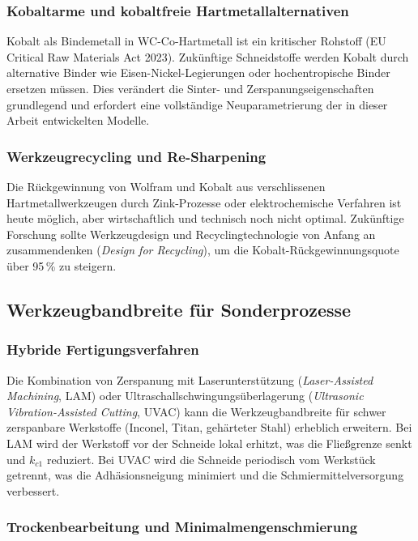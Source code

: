 ﻿\documentclass[a4paper,12pt]{article}
\theoremstyle{definition}
\begin{document}
\subsubsection{Kobaltarme und kobaltfreie Hartmetallalternativen}

Kobalt als Bindemetall in WC-Co-Hartmetall ist ein kritischer Rohstoff (EU
Critical Raw Materials Act 2023). Zukünftige Schneidstoffe werden Kobalt
durch alternative Binder wie Eisen-Nickel-Legierungen oder hochentropische
Binder ersetzen müssen. Dies verändert die Sinter- und Zerspanungseigenschaften
grundlegend und erfordert eine vollständige Neuparametrierung der in dieser
Arbeit entwickelten Modelle.

\subsubsection{Werkzeugrecycling und Re-Sharpening}

Die Rückgewinnung von Wolfram und Kobalt aus verschlissenen Hartmetallwerkzeugen
durch Zink-Prozesse oder elektrochemische Verfahren ist heute möglich, aber
wirtschaftlich und technisch noch nicht optimal. Zukünftige Forschung sollte
Werkzeugdesign und Recyclingtechnologie von Anfang an zusammendenken
(\emph{Design for Recycling}), um die Kobalt-Rückgewinnungsquote über 95\,\%
zu steigern.

\subsection{Werkzeugbandbreite für Sonderprozesse}

\subsubsection{Hybride Fertigungsverfahren}

Die Kombination von Zerspanung mit Laserunterstützung (\emph{Laser-Assisted
Machining}, LAM) oder Ultraschallschwingungsüberlagerung
(\emph{Ultrasonic Vibration-Assisted Cutting}, UVAC) kann die
Werkzeugbandbreite für schwer zerspanbare Werkstoffe (Inconel, Titan,
gehärteter Stahl) erheblich erweitern. Bei LAM wird der Werkstoff vor der
Schneide lokal erhitzt, was die Fließgrenze senkt und $k_{c1}$ reduziert.
Bei UVAC wird die Schneide periodisch vom Werkstück getrennt, was die
Adhäsionsneigung minimiert und die Schmiermittelversorgung verbessert.

\subsubsection{Trockenbearbeitung und Minimalmengenschmierung}
\end{document}
